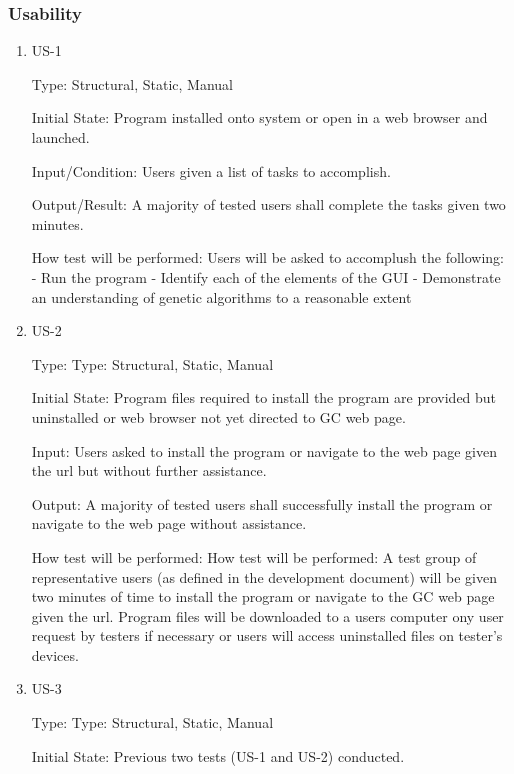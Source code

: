 \documentclass[12pt, titlepage]{article}
\begin{document}
\subsubsection{Usability}

\begin{enumerate}

\item{US-1\\}

Type: Structural, Static, Manual
					
Initial State: Program installed onto system or open in a web browser and launched.
					
Input/Condition: Users given a list of tasks to accomplish.
					
Output/Result: A majority of tested users shall complete the tasks given two minutes.
					
How test will be performed: Users will be asked to accomplush the following:
- Run the program
- Identify each of the elements of the GUI
- Demonstrate an understanding of genetic algorithms to a reasonable extent

\item{US-2\\}

Type: Type: Structural, Static, Manual
					
Initial State: Program files required to install the program are provided but uninstalled or web browser not yet directed to GC web page.
					
Input: Users asked to install the program or navigate to the web page given the url but without further assistance.
					
Output: A majority of tested users shall successfully install the program or navigate to the web page without assistance.
					
How test will be performed: How test will be performed: A test group of representative users (as defined in the development document) will be given two minutes of time to install the program or navigate to the GC web page given the url. Program files will be downloaded to a users computer ony user request by testers if necessary or users will access uninstalled files on tester's devices.

\item{US-3\\}

Type: Type: Structural, Static, Manual
					
Initial State: Previous two tests (US-1 and US-2) conducted.
					

\end{enumerate}
\end{document}
